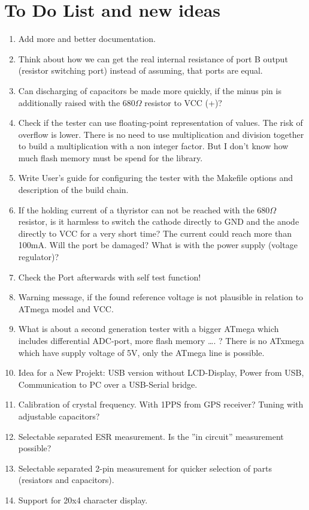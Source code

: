
\chapter{To Do List and new ideas}
\label{sec:todo}

\begin{enumerate}
\item Add more and better documentation.
\item Think about how we can get the real internal resistance of port B output (resistor switching port) instead of assuming, that ports are equal.
\item Can discharging of capacitors be made more quickly, if the minus pin is additionally raised
with the \(680\Omega\) resistor to VCC (+)?
\item Check if the tester can use floating-point representation of  values. The risk of overflow  is lower.
There is no need to use multiplication and division together to build a multiplication with a non integer factor.
But I don't know how much flash memory must be spend for the library.
\item Write User's guide for configuring the tester with the Makefile options and description of the build chain.
\item If the holding current of a thyristor can not be reached with the \(680\Omega\) resistor, is it harmless to switch the cathode directly to GND
and the anode directly to VCC for a very short time?
The current could reach more than 100mA. Will the port be damaged? What is with the power supply (voltage regulator)?
\item Check the Port afterwards with self test function!
\item Warning message, if the found reference voltage is not plausible in relation to ATmega model and VCC.
\item What is about a second generation tester with a bigger ATmega which includes differential ADC-port, more flash memory …. ?
There is no ATxmega which have supply voltage of 5V, only the ATmega line  is possible. 
\item Idea for a New Projekt: USB  version without LCD-Display, Power from USB, Communication to PC over a USB-Serial bridge.
\item Calibration of crystal frequency. With 1PPS from GPS receiver? Tuning with adjustable capacitors?
\item Selectable separated ESR measurement. Is the ''in circuit'' measurement possible?
\item Selectable separated 2-pin measurement for quicker selection of parts (resiators and capacitors).
\item Support for 20x4 character display.

\end{enumerate}
